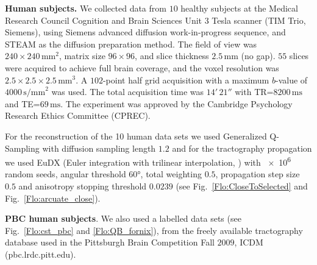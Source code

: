 \documentclass{bioinfo}
\begin{document}
\begin{methods}
\textbf{Human subjects.} We collected data from $10$ healthy subjects at
the Medical Research Council Cognition and Brain Sciences Unit 3 Tesla scanner
(TIM Trio, Siemens), using Siemens advanced diffusion work-in-progress sequence,
and STEAM \citep{merboldt1992diffusion,MAB04} as the diffusion preparation
method. The field of view was $240\times240\,\textrm{mm}^{2}$, matrix size
$96\times96$, and slice thickness $2.5\,\textrm{mm}$ (no gap).  $55$ slices were
acquired to achieve full brain coverage, and the voxel resolution was
$2.5\times2.5\times2.5\,\textrm{mm}^{3}$. A $102$-point half grid acquisition
\citep{Yeh2010} with a maximum $b$-value of $4000\, \textrm{s/mm}^{2}$ was used.
The total acquisition time was $14'\,21''$ with TR=$8200\,\textrm{ms}$ and
TE=$69\,\textrm{ms}$. The experiment was approved by the Cambridge Psychology
Research Ethics Committee (CPREC).

For the reconstruction of the 10 human data sets we used Generalized
Q-Sampling \citep{Yeh2010} with diffusion sampling length $1.2$ and for
the tractography propagation we used EuDX (Euler integration with
trilinear interpolation, \citep{Garyfallidis_thesis}) with \num{e6}
random seeds, angular threshold \ang{60}, total weighting $0.5$,
propagation step size $0.5$ and anisotropy stopping threshold $0.0239$
(see Fig.~\ref{Flo:CloseToSelected} and Fig.~\ref{Flo:arcuate_close}).

\textbf{PBC human subjects}. We also used a labelled data sets (see
Fig.~\ref{Flo:cst_pbc} and \ref{Flo:QB_fornix}), from the freely available
tractography database used in the Pittsburgh Brain Competition Fall
$2009$, ICDM (pbc.lrdc.pitt.edu).

\end{methods}


\end{document}
